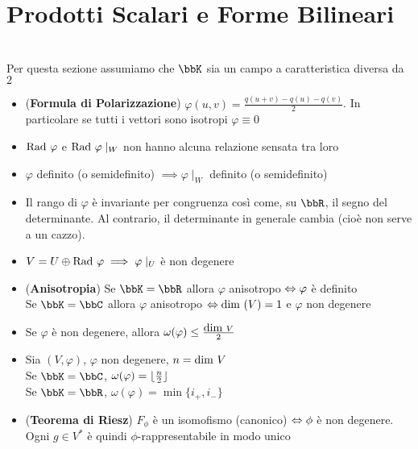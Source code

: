 \documentclass[a4paper,NoNotes,GeneralMath]{stdmdoc}
\begin{document}
	\section*{Prodotti Scalari e Forme Bilineari}
	\Achtung \\ Per questa sezione assumiamo che $\bbK$ sia un campo a caratteristica diversa da $2$
	\begin{itemize}
		\item ({\bf Formula di Polarizzazione}) $\varphi(u,v) = \frac{q(u+v)-q(u)-q(v)}{2}$. In particolare se tutti i vettori sono isotropi $\varphi \equiv 0$
		\item $\mbox{Rad }\varphi$ e $\mbox{Rad }\varphi\mid_W$ non hanno alcuna relazione sensata tra loro
		\item $\varphi$ definito (o semidefinito) $\implies \varphi\mid_W$ definito (o semidefinito)
		\item Il rango di $\varphi$ è invariante per congruenza così come, su $\bbR$, il segno del determinante. Al contrario, il determinante in generale cambia (cioè non serve a un cazzo).
		\item $V = U \oplus \mbox{Rad }\varphi \implies \varphi\mid_U$ è non degenere
		\item ({\bf Anisotropia}) Se $\bbK = \bbR$ allora $\varphi$ anisotropo $\Leftrightarrow \varphi$ è definito \\ Se $\bbK = \bbC$ allora $\varphi$ anisotropo $\Leftrightarrow \mbox{dim }(V) = 1$ e $\varphi$ non degenere
	\end{itemize}
	\begin{itemize}
		\item Se $\varphi$ è non degenere, allora $\omega(\varphi) \le \frac{\mbox{dim } V}{2}$
		\item Sia $(V, \varphi)$, $\varphi$ non degenere, $n = \mbox{dim } V$ \\ Se $\bbK = \bbC$, $\omega(\varphi) = \lfloor \frac{n}{2} \rfloor$ \\ Se $\bbK = \bbR$, $\omega(\varphi) = \min\{i_{+}, i_{-}\}$
		\item ({\bf Teorema di Riesz}) $F_\phi$ è un isomofismo (canonico) $\Leftrightarrow \phi$ è non degenere. Ogni $g \in V^{*}$ è quindi $\phi$-rappresentabile in modo unico
	\end{itemize}
\end{document}

